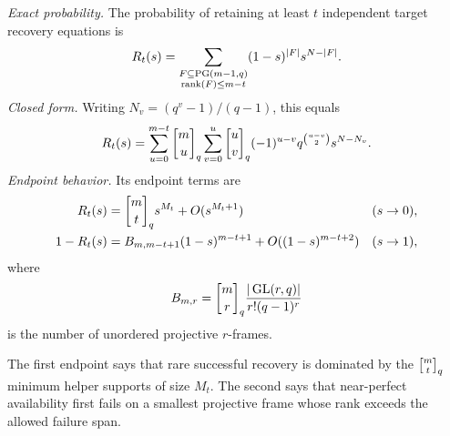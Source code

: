 \begin{theorem}
\label{thm:projective-reliability}
%
\emph{Exact probability.}
The probability of retaining at least $t$ independent target recovery
equations is
\begin{equation}
 R_t(s)=
 \sum_{\substack{F\subseteq\operatorname{PG}(m-1,q)\\
                  \operatorname{rank}(F)\leq m-t}}
 (1-s)^{|F|}s^{N-|F|}.
 \label{eq:projective-rank-reliability}
\end{equation}
\emph{Closed form.}
Writing $N_v=(q^v-1)/(q-1)$, this equals
\begin{equation}
 R_t(s)=
 \sum_{u=0}^{m-t}\qbinom{m}{u}
 \sum_{v=0}^{u}\qbinom{u}{v}
 (-1)^{u-v}q^{\binom{u-v}{2}}s^{N-N_v}.
 \label{eq:projective-mobius-reliability}
\end{equation}
\emph{Endpoint behavior.}
Its endpoint terms are
\begin{align}
 R_t(s)&=\qbinom{m}{t}s^{M_t}+O(s^{M_t+1})
 &&(s\to0),
 \label{eq:rare-survival}\\
 1-R_t(s)&=B_{m,m-t+1}(1-s)^{m-t+1}
            +O((1-s)^{m-t+2})
 &&(s\to1),
 \label{eq:rare-failure}
\end{align}
where
\[
 B_{m,r}=\qbinom{m}{r}
          \frac{|\operatorname{GL}(r,q)|}{r!(q-1)^r}
\]
is the number of unordered projective $r$-frames.
\end{theorem}

The first endpoint says that rare successful recovery is dominated by the
$\qbinom mt$ minimum helper supports of size $M_t$.  The second says that
near-perfect availability first fails on a smallest projective frame whose
rank exceeds the allowed failure span.

